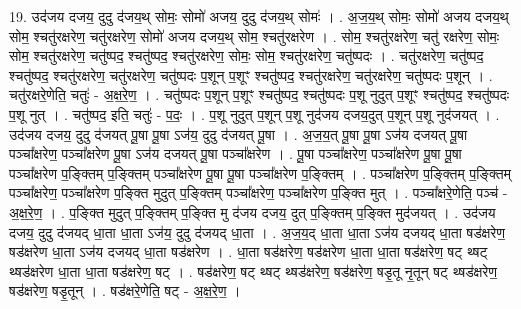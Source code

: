 \documentclass[17pt]{extarticle}
\begin{document}
19. उद॑जय दजय॒ दुदु द॑जय॒थ् सोमः॒ सोमो॑ अजय॒ दुदु द॑जय॒थ् सोमः॑ । . अ॒ज॒य॒थ् सोमः॒ सोमो॑ अजय दजय॒थ् सोम॒ श्चतु॑रक्षरेण॒ चतु॑रक्षरेण॒ सोमो॑ अजय दजय॒थ् सोम॒ श्चतु॑रक्षरेण । . सोम॒ श्चतु॑रक्षरेण॒ चतु॑ रक्षरेण॒ सोमः॒ सोम॒ श्चतु॑रक्षरेण॒ चतु॑ष्पद॒ श्चतु॑ष्पद॒ श्चतु॑रक्षरेण॒ सोमः॒ सोम॒ श्चतु॑रक्षरेण॒ चतु॑ष्पदः । . चतु॑रक्षरेण॒ चतु॑ष्पद॒ श्चतु॑ष्पद॒ श्चतु॑रक्षरेण॒ चतु॑रक्षरेण॒ चतु॑ष्पदः प॒शून्  
प॒शूꣳ श्चतु॑ष्पद॒ श्चतु॑रक्षरेण॒ चतु॑रक्षरेण॒ चतु॑ष्पदः प॒शून् । . चतु॑रक्षरे॒णेति॒ चतुः॑ - अ॒क्ष॒रे॒ण॒ । . चतु॑ष्पदः प॒शून् प॒शूꣳ श्चतु॑ष्पद॒ श्चतु॑ष्पदः प॒शू नुदुत् प॒शूꣳ श्चतु॑ष्पद॒ श्चतु॑ष्पदः प॒शू नुत् । . चतु॑ष्पद॒ इति॒ चतुः॑ - प॒दः॒ । . प॒शू नुदुत् प॒शून् प॒शू नुद॑जय दजय॒दुत् प॒शून् प॒शू नुद॑जयत् । . उद॑जय दजय॒ दुदु द॑जयत् पू॒षा पू॒षा ऽज॑य॒ दुदु द॑जयत् पू॒षा । . अ॒ज॒य॒त् पू॒षा पू॒षा ऽज॑य दजयत् पू॒षा पञ्चा᳚क्षरेण॒ पञ्चा᳚क्षरेण पू॒षा ऽज॑य दजयत् पू॒षा 
पञ्चा᳚क्षरेण । . पू॒षा पञ्चा᳚क्षरेण॒ पञ्चा᳚क्षरेण पू॒षा पू॒षा पञ्चा᳚क्षरेण प॒ङ्क्तिम् प॒ङ्क्तिम् पञ्चा᳚क्षरेण पू॒षा पू॒षा पञ्चा᳚क्षरेण प॒ङ्क्तिम् । . पञ्चा᳚क्षरेण प॒ङ्क्तिम् प॒ङ्क्तिम् पञ्चा᳚क्षरेण॒ पञ्चा᳚क्षरेण प॒ङ्क्ति मुदुत् प॒ङ्क्तिम् पञ्चा᳚क्षरेण॒ 
पञ्चा᳚क्षरेण प॒ङ्क्ति मुत् । . पञ्चा᳚क्षरे॒णेति॒ पञ्च॑ - अ॒क्ष॒रे॒ण॒ । . प॒ङ्क्ति मुदुत् प॒ङ्क्तिम् प॒ङ्क्ति मु द॑जय दजय॒ दुत् प॒ङ्क्तिम् प॒ङ्क्ति मुद॑जयत् । . उद॑जय दजय॒ दुदु द॑जयद् धा॒ता धा॒ता ऽज॑य॒ दुदु द॑जयद् धा॒ता । . अ॒ज॒य॒द् धा॒ता धा॒ता ऽज॑य दजयद् धा॒ता षड॑क्षरेण॒ षड॑क्षरेण धा॒ता ऽज॑य दजयद् धा॒ता 
षड॑क्षरेण । . धा॒ता षड॑क्षरेण॒ षड॑क्षरेण धा॒ता धा॒ता षड॑क्षरेण॒ षट् थ्षट् थ्षड॑क्षरेण धा॒ता धा॒ता षड॑क्षरेण॒ षट् । . षड॑क्षरेण॒ षट् थ्षट् थ्षड॑क्षरेण॒ षड॑क्षरेण॒ षडृ॒तू नृ॒तून् षट् 
थ्षड॑क्षरेण॒ षड॑क्षरेण॒ षडृ॒तून् । . षड॑क्षरे॒णेति॒ षट् - अ॒क्ष॒रे॒ण॒ । \newline
\end{document}
